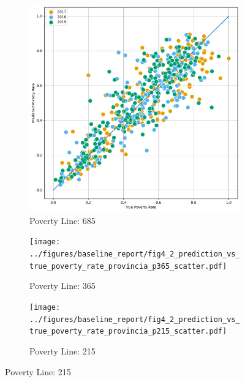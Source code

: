 \begin{figure}[H]
    \caption{Correlation: Predicted Poverty against true by Province (WB Version)}
    \centering
         \centering
         \begin{subfigure}[b]{0.47\textwidth}
             \centering
             \includegraphics[width=\textwidth]{../figures/baseline_report/fig4_3_prediction_vs_true_poverty_rate_provincia_p685_scatter.pdf}
             \caption{Poverty Line: 685}
         \end{subfigure}
         \hfill
         \begin{subfigure}[b]{0.47\textwidth}
             \centering
             \texttt{[image: ../figures/baseline\_report/fig4\_2\_prediction\_vs\_true\_poverty\_rate\_provincia\_p365\_scatter.pdf]}
             \caption{Poverty Line: 365}
         \end{subfigure} 
          \hfill
         \begin{subfigure}[b]{0.47\textwidth}
             \centering
             \texttt{[image: ../figures/baseline\_report/fig4\_2\_prediction\_vs\_true\_poverty\_rate\_provincia\_p215\_scatter.pdf]}
             \caption{Poverty Line: 215}
         \end{subfigure} 
\end{figure}



